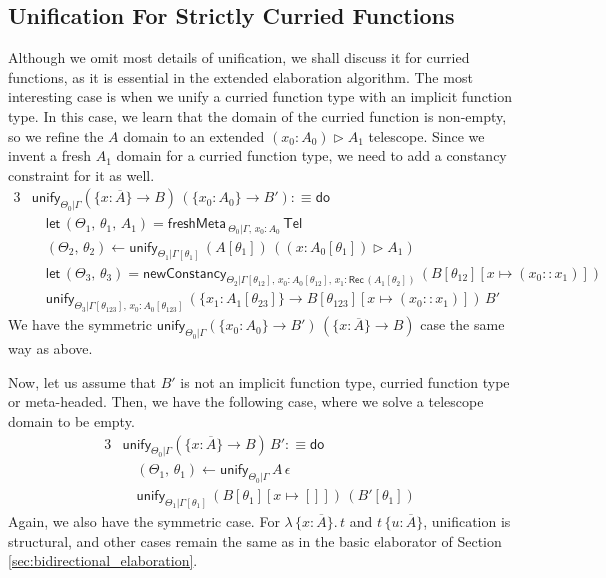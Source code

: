 \documentclass[acmsmall,review,anonymous,prologue,dvipsnames]{acmart}\settopmatter{printfolios=true,printccs=false,printacmref=false}
\newcommand{\slet}{\boldsymbol{\mathsf{let}}}
\newcommand{\freshMeta}[3]{\mathsf{freshMeta}\,_{#1|#2}\,#3}
\newcommand{\newConstancy}[5]{\mathsf{newConstancy}_{#1|#2,\,#3 : \Rec\,#4}\,#5}
\newcommand{\unify}{\mathsf{unify}}
\newcommand{\edo}{\boldsymbol{\mathsf{do}}}
\newcommand{\Tel}{\mathsf{Tel}}
\newcommand{\TCons}{\triangleright}
\newcommand{\Rec}{\mathsf{Rec}}
\newcommand{\ol}[1]{\overline{#1}}
\theoremstyle{remark}
\begin{document}
\subsection{Unification For Strictly Curried Functions}
Although we omit most details of unification, we shall discuss it for curried
functions, as it is essential in the extended elaboration algorithm.  The most
interesting case is when we unify a curried function type with an implicit
function type. In this case, we learn that the domain of the curried function is
non-empty, so we refine the $A$ domain to an extended $(x_0 : A_0) \TCons A_1$
telescope. Since we invent a fresh $A_1$ domain for a curried function type, we
need to add a constancy constraint for it as well.
\begin{alignat*}{3}
& \unify_{\Theta_0|\Gamma}(\{x : \ol{A}\}\to B)\,(\{x_0 : A_0\}\to B') :\equiv \edo\\
& \quad \slet\,(\Theta_1,\,\theta_1,\,A_1) = \freshMeta{\Theta_0}{\Gamma,\,x_0 : A_0}{\Tel}\\
& \quad (\Theta_2,\,\theta_2) \leftarrow
  \unify_{\Theta_1|\Gamma[\theta_1]}\,(A[\theta_1])\,((x : A_0[\theta_1])\TCons A_1)\\
& \quad \slet\,(\Theta_3,\,\theta_3) =
    \newConstancy{\Theta_2}{\Gamma[\theta_{12}],\,x_0 : A_0[\theta_{12}]}{x_1}{(A_1[\theta_2])}{(B[\theta_{12}][x\mapsto (x_0 :: x_1)])}\\
& \quad\unify_{\Theta_3|\Gamma[\theta_{123}],\,x_0 : A_0[\theta_{123}]}\,
         (\{x_1 : A_1[\theta_{23}]\}\to B[\theta_{123}][x\mapsto (x_0 :: x_1)])\,B'
\end{alignat*}
We have the symmetric $\unify_{\Theta_0|\Gamma}(\{x_0 : A_0\}\to B')\,(\{x :
\ol{A}\}\to B)$ case the same way as above.

Now, let us assume that $B'$ is not an implicit function type, curried function
type or meta-headed. Then, we have the following case, where we solve a
telescope domain to be empty.
\begin{alignat*}{3}
& \unify_{\Theta_0|\Gamma}(\{x : \ol{A}\}\to B)\,B' :\equiv \edo\\
& \quad (\Theta_1,\,\theta_1) \leftarrow \unify_{\Theta_0|\Gamma}\,A\,\epsilon\\
& \quad \unify_{\Theta_1|\Gamma[\theta_1]}\,(B[\theta_1][x\mapsto[]])\,(B'[\theta_1])
\end{alignat*}
Again, we also have the symmetric case. For $\lambda\,\{x : \ol{A}\}.\,t$ and
$t\,\{u : \ol{A}\}$, unification is structural, and other cases remain the same
as in the basic elaborator of Section \ref{sec:bidirectional_elaboration}.
\end{document}
